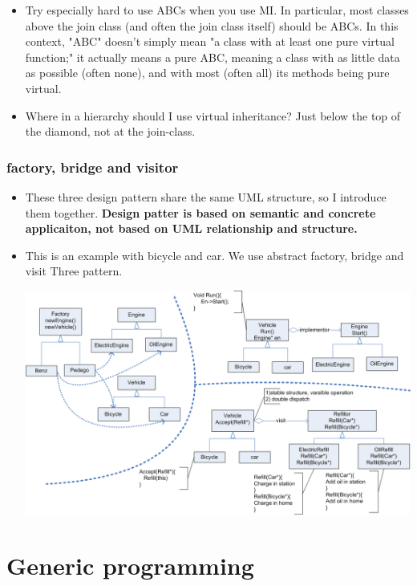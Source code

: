 \documentclass[a4paper,11pt,twoside]{book}
\begin{document}
\begin{itemize}
	\item Try especially hard to use ABCs when you use MI. In particular, most classes above the join class (and often the join class itself) should be ABCs. In this context, "ABC" doesn't simply mean "a class with at least one pure virtual function;" it actually means a pure ABC, meaning a class with as little data as possible (often none), and with most (often all) its methods being pure virtual.
	
	\item Where in a hierarchy should I use virtual inheritance?  Just below the top of the diamond, not at the join-class.
	
\end{itemize}

\subsection{factory, bridge and visitor}

\begin{itemize}
	\item These three design pattern share the same UML structure, so I introduce them together. \textbf{Design patter is based on semantic and concrete applicaiton, not based on UML relationship and structure.}
	
	\item This is an example with bicycle and car.  We use abstract factory, bridge and visit Three pattern. 

		\centering
		\includegraphics[width=0.9\linewidth]{pics/visitor.png}
	
\end{itemize}

\chapter{Generic programming}
\end{document}
